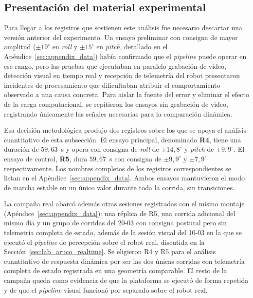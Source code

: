 \documentclass[12pt,a4paper]{report}
\begin{document}
\subsection{Presentación del material experimental}

Para llegar a los registros que sostienen este análisis fue necesario descartar
una versión anterior del experimento. Un ensayo preliminar con consigna de mayor
amplitud (\(\pm 19^\circ\) en \emph{roll} y \(\pm 15^\circ\) en \emph{pitch}, detallado en el
Apéndice~\ref{sec:appendix_data}) había confirmado que el \textit{pipeline} puede operar
en ese rango, pero las pruebas que ejecutaban en paralelo grabación de video,
detección visual en tiempo real y recepción de telemetría del robot presentaron
incidentes de procesamiento que dificultaban atribuir el comportamiento observado
a una causa concreta. Para aislar la fuente del error y eliminar el efecto de la
carga computacional, se repitieron los ensayos sin grabación de video, registrando
únicamente las señales necesarias para la comparación dinámica.

Esa decisión metodológica produjo dos registros sobre los que se apoya el análisis
cuantitativo de esta subsección. El ensayo principal, denominado \textbf{R4}, tiene
una duración de \(59{,}63\)~s y opera con consigna de \emph{roll} de \(\pm 14{,}8^\circ\)
y \emph{pitch} de \(\pm 9{,}9^\circ\). El ensayo de control, \textbf{R5}, dura
\(59{,}67\)~s con consigna de \(\pm 9{,}9^\circ\) y \(\pm 7{,}9^\circ\)
respectivamente. Los nombres completos de los registros correspondientes se listan en el
Apéndice~\ref{sec:appendix_data}. Ambos ensayos mantuvieron el modo de marcha
estable en un único valor durante toda la corrida, sin transiciones.

La campaña real abarcó además otras sesiones registradas con el mismo montaje
(Apéndice~\ref{sec:appendix_data}): una réplica de R5, una corrida adicional del
mismo día y un grupo de corridas del 20-03 con consigna postural pero sin
telemetría completa de estado, además de la sesión visual del
10-03 en la que se ejecutó el \textit{pipeline} de percepción sobre el robot real, discutida
en la Sección~\ref{sec:lab_aruco_realtime}. Se eligieron R4 y R5 para el análisis
cuantitativo de respuesta dinámica por ser las dos únicas corridas con telemetría
completa de estado registrada en una geometría comparable. El resto de la campaña
queda como evidencia de que la plataforma se ejecutó de forma repetida y de que el
\textit{pipeline} visual funcionó por separado sobre el robot real.
\end{document}
